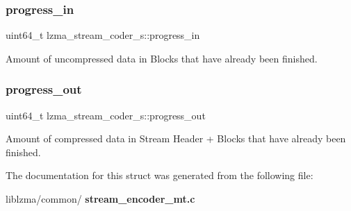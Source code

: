\subsubsection{progress\+\_\+in}
{\footnotesize\ttfamily uint64\+\_\+t lzma\+\_\+stream\+\_\+coder\+\_\+s\+::progress\+\_\+in}

Amount of uncompressed data in Blocks that have already been finished. \mbox{\label{structlzma__stream__coder__s_a5ebef6b7ef1b47b17ed2bccab56cf3e9}} 
\subsubsection{progress\+\_\+out}
{\footnotesize\ttfamily uint64\+\_\+t lzma\+\_\+stream\+\_\+coder\+\_\+s\+::progress\+\_\+out}

Amount of compressed data in Stream Header + Blocks that have already been finished. 

The documentation for this struct was generated from the following file\+:\begin{DoxyCompactItemize}
\item 
liblzma/common/\textbf{ stream\+\_\+encoder\+\_\+mt.\+c}\end{DoxyCompactItemize}
